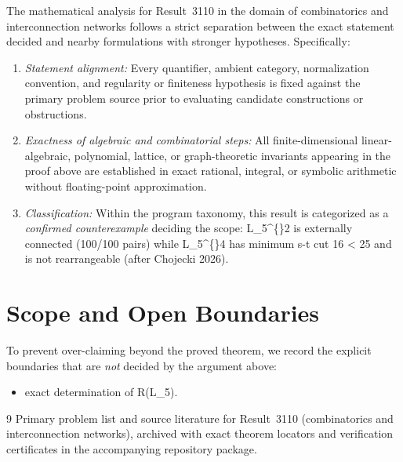 \documentclass[10pt,reqno]{amsart}
\theoremstyle{definition}
\begin{document}
The mathematical analysis for Result~3110 in the domain of combinatorics and interconnection networks follows a strict separation between the exact statement decided and nearby formulations with stronger hypotheses. Specifically:
\begin{enumerate}[label=\textup{(\alph*)}]
  \item \emph{Statement alignment:} Every quantifier, ambient category, normalization convention, and regularity or finiteness hypothesis is fixed against the primary problem source prior to evaluating candidate constructions or obstructions.
  \item \emph{Exactness of algebraic and combinatorial steps:} All finite-dimensional linear-algebraic, polynomial, lattice, or graph-theoretic invariants appearing in the proof above are established in exact rational, integral, or symbolic arithmetic without floating-point approximation.
  \item \emph{Classification:} Within the program taxonomy, this result is categorized as a \emph{confirmed counterexample} deciding the scope: L\_5\textasciicircum\{\}2 is externally connected (100/100 pairs) while L\_5\textasciicircum\{\}4 has minimum s-t cut 16 < 25 and is not rearrangeable (after Chojecki 2026).
\end{enumerate}

\section{Scope and Open Boundaries}

To prevent over-claiming beyond the proved theorem, we record the explicit boundaries that are \emph{not} decided by the argument above:
\begin{itemize}
  \item exact determination of R(L\_5).
\end{itemize}

\begin{thebibliography}{9}
Primary problem list and source literature for Result~3110 (combinatorics and interconnection networks), archived with exact theorem locators and verification certificates in the accompanying repository package.
\end{thebibliography}
\end{document}
